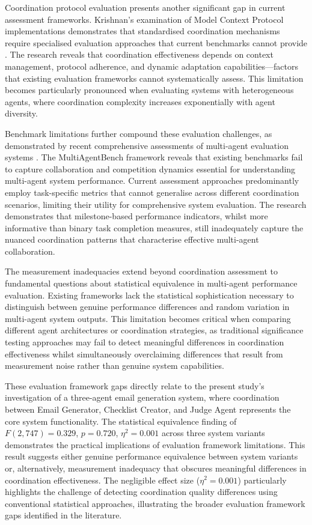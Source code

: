 Coordination protocol evaluation presents another significant gap in current assessment frameworks. Krishnan's examination of Model Context Protocol implementations demonstrates that standardised coordination mechanisms require specialised evaluation approaches that current benchmarks cannot provide \cite{krishnan2025mcp_coordination}. The research reveals that coordination effectiveness depends on context management, protocol adherence, and dynamic adaptation capabilities—factors that existing evaluation frameworks cannot systematically assess. This limitation becomes particularly pronounced when evaluating systems with heterogeneous agents, where coordination complexity increases exponentially with agent diversity.

Benchmark limitations further compound these evaluation challenges, as demonstrated by recent comprehensive assessments of multi-agent evaluation systems \cite{zhu2025multiagentbench}. The MultiAgentBench framework reveals that existing benchmarks fail to capture collaboration and competition dynamics essential for understanding multi-agent system performance. Current assessment approaches predominantly employ task-specific metrics that cannot generalise across different coordination scenarios, limiting their utility for comprehensive system evaluation. The research demonstrates that milestone-based performance indicators, whilst more informative than binary task completion measures, still inadequately capture the nuanced coordination patterns that characterise effective multi-agent collaboration.

The measurement inadequacies extend beyond coordination assessment to fundamental questions about statistical equivalence in multi-agent performance evaluation. Existing frameworks lack the statistical sophistication necessary to distinguish between genuine performance differences and random variation in multi-agent system outputs. This limitation becomes critical when comparing different agent architectures or coordination strategies, as traditional significance testing approaches may fail to detect meaningful differences in coordination effectiveness whilst simultaneously overclaiming differences that result from measurement noise rather than genuine system capabilities.

These evaluation framework gaps directly relate to the present study's investigation of a three-agent email generation system, where coordination between Email Generator, Checklist Creator, and Judge Agent represents the core system functionality. The statistical equivalence finding of $F(2,747) = 0.329$, $p = 0.720$, $\eta^2 = 0.001$ across three system variants demonstrates the practical implications of evaluation framework limitations. This result suggests either genuine performance equivalence between system variants or, alternatively, measurement inadequacy that obscures meaningful differences in coordination effectiveness. The negligible effect size ($\eta^2 = 0.001$) particularly highlights the challenge of detecting coordination quality differences using conventional statistical approaches, illustrating the broader evaluation framework gaps identified in the literature.

